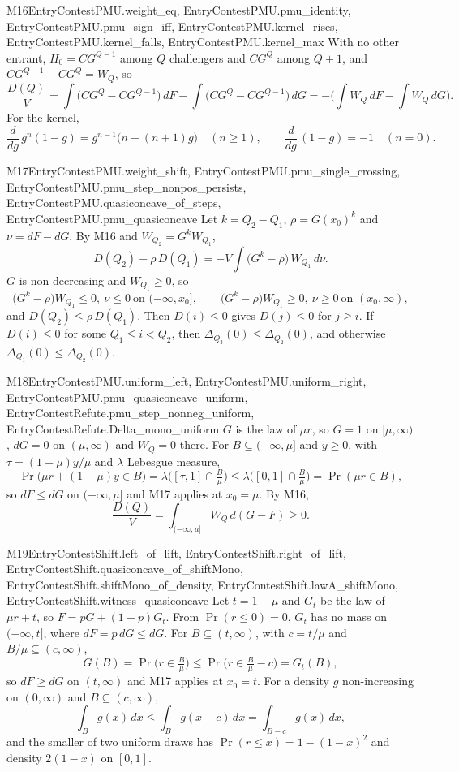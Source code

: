 \begin{mproof}{M16}{EntryContestPMU.weight_eq, EntryContestPMU.pmu_identity, EntryContestPMU.pmu_sign_iff, EntryContestPMU.kernel_rises, EntryContestPMU.kernel_falls, EntryContestPMU.kernel_max}
With no other entrant, $H_0=CG^{Q-1}$ among $Q$ challengers and $CG^{Q}$ among
$Q+1$, and $CG^{Q-1}-CG^{Q}=W_Q$, so
\[
  \frac{D(Q)}V=\int\big(CG^{Q}-CG^{Q-1}\big)\,dF-\int\big(CG^{Q}-CG^{Q-1}\big)\,dG
  =-\Big(\int W_Q\,dF-\int W_Q\,dG\Big).
\]
For the kernel,
\[
  \frac{d}{dg}\,g^n(1-g)=g^{n-1}\big(n-(n+1)g\big)\quad(n\ge1),\qquad
  \frac{d}{dg}\,(1-g)=-1\quad(n=0).
\]
\end{mproof}

\begin{mproof}{M17}{EntryContestPMU.weight_shift, EntryContestPMU.pmu_single_crossing, EntryContestPMU.pmu_step_nonpos_persists, EntryContestPMU.quasiconcave_of_steps, EntryContestPMU.pmu_quasiconcave}
Let $k=Q_2-Q_1$, $\rho=G(x_0)^k$ and $\nu=dF-dG$. By M16 and $W_{Q_2}=G^kW_{Q_1}$,
\[
  D(Q_2)-\rho\,D(Q_1)=-V\int\big(G^k-\rho\big)\,W_{Q_1}\,d\nu .
\]
$G$ is non-decreasing and $W_{Q_1}\ge0$, so
\[
  \big(G^k-\rho\big)W_{Q_1}\le0,\ \nu\le0\ \text{on }(-\infty,x_0],\qquad
  \big(G^k-\rho\big)W_{Q_1}\ge0,\ \nu\ge0\ \text{on }(x_0,\infty),
\]
and $D(Q_2)\le\rho\,D(Q_1)$. Then $D(i)\le0$ gives $D(j)\le0$ for $j\ge i$. If
$D(i)\le0$ for some $Q_1\le i<Q_2$, then $\Delta_{Q_3}(0)\le\Delta_{Q_2}(0)$, and
otherwise $\Delta_{Q_1}(0)\le\Delta_{Q_2}(0)$.
\end{mproof}

\begin{mproof}{M18}{EntryContestPMU.uniform_left, EntryContestPMU.uniform_right, EntryContestPMU.pmu_quasiconcave_uniform, EntryContestRefute.pmu_step_nonneg_uniform, EntryContestRefute.Delta_mono_uniform}
$G$ is the law of $\mu r$, so $G=1$ on $[\mu,\infty)$, $dG=0$ on $(\mu,\infty)$
and $W_Q=0$ there. For $B\subseteq(-\infty,\mu]$ and $y\ge0$, with
$\tau=(1-\mu)y/\mu$ and $\lambda$ Lebesgue measure,
\[
  \Pr\big(\mu r+(1-\mu)y\in B\big)=\lambda\Big([\tau,1]\cap\tfrac B\mu\Big)
  \le\lambda\Big([0,1]\cap\tfrac B\mu\Big)=\Pr(\mu r\in B),
\]
so $dF\le dG$ on $(-\infty,\mu]$ and M17 applies at $x_0=\mu$. By M16,
\[
  \frac{D(Q)}V=\int_{(-\infty,\mu]}W_Q\,d(G-F)\ge0 .
\]
\end{mproof}

\begin{mproof}{M19}{EntryContestShift.left_of_lift, EntryContestShift.right_of_lift, EntryContestShift.quasiconcave_of_shiftMono, EntryContestShift.shiftMono_of_density, EntryContestShift.lawA_shiftMono, EntryContestShift.witness_quasiconcave}
Let $t=1-\mu$ and $G_t$ be the law of $\mu r+t$, so $F=pG+(1-p)G_t$. From
$\Pr(r\le0)=0$, $G_t$ has no mass on $(-\infty,t]$, where $dF=p\,dG\le dG$. For
$B\subseteq(t,\infty)$, with $c=t/\mu$ and $B/\mu\subseteq(c,\infty)$,
\[
  G(B)=\Pr\big(r\in\tfrac B\mu\big)\le\Pr\big(r\in\tfrac B\mu-c\big)=G_t(B),
\]
so $dF\ge dG$ on $(t,\infty)$ and M17 applies at $x_0=t$. For a density $g$
non-increasing on $(0,\infty)$ and $B\subseteq(c,\infty)$,
\[
  \int_B g(x)\,dx\le\int_B g(x-c)\,dx=\int_{B-c}g(x)\,dx ,
\]
and the smaller of two uniform draws has $\Pr(r\le x)=1-(1-x)^2$ and density
$2(1-x)$ on $[0,1]$.
\end{mproof}

